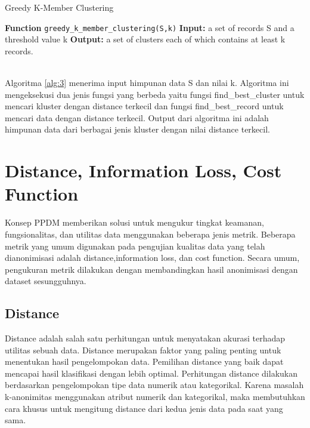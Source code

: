 \begin{algorithm}[H]
  \caption{Greedy K-Member Clustering}		 \label{alg:3}
  \begin{algorithmic}[1]
  \State \textbf{Function} \texttt{greedy\_k\_member\_clustering(S,k)}
  \State \textbf{Input:} a set of records S and a threshold value k
  \State \textbf{Output:} a set of clusters each of which contains at least k records.
  \\
  \EndIf
  \\
  	\EndWhile
  \EndWhile
  \EndWhile
  \end{algorithmic}
\end{algorithm}

Algoritma \ref{alg:3} menerima input himpunan data S dan nilai k. Algoritma ini mengeksekusi dua jenis fungsi yang berbeda yaitu fungsi find\_best\_cluster untuk mencari kluster dengan distance terkecil dan fungsi find\_best\_record untuk mencari data dengan distance terkecil. Output dari algoritma ini adalah himpunan data dari berbagai jenis kluster dengan nilai distance terkecil.



\section{Distance, Information Loss, Cost Function} 
Konsep PPDM memberikan solusi untuk mengukur tingkat keamanan, fungsionalitas, dan utilitas data menggunakan beberapa jenis metrik.  Beberapa metrik yang umum digunakan pada pengujian kualitas data yang telah dianonimisasi adalah distance,information loss, dan cost function. Secara umum, pengukuran metrik dilakukan dengan membandingkan hasil anonimisasi dengan dataset sesungguhnya. 

\subsection{Distance} 
Distance adalah salah satu perhitungan untuk menyatakan akurasi terhadap utilitas sebuah data. Distance merupakan faktor yang paling penting untuk menentukan hasil pengelompokan data. Pemilihan distance yang baik dapat mencapai hasil klasifikasi dengan lebih optimal. Perhitungan distance dilakukan berdasarkan pengelompokan tipe data numerik atau kategorikal. Karena masalah k-anonimitas menggunakan atribut numerik dan kategorikal, maka membutuhkan cara khusus untuk mengitung distance dari kedua jenis data pada saat yang sama. 

